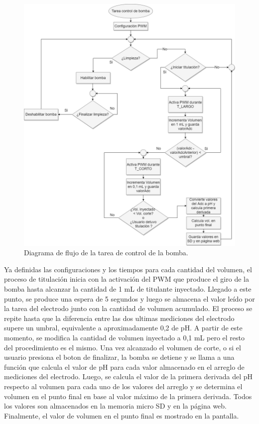 \begin{figure}[htbp]
	\centering
	\includegraphics[width=1.0\textwidth]{./Figures/motorBomba.png}
	\caption{Diagrama de flujo de la tarea de control de la bomba.}
	\label{fig:flujoBomba}
\end{figure}

Ya definidas las configuraciones y los tiempos para cada cantidad del volumen, el proceso de titulación inicia con la activación del PWM que produce el giro de la bomba hasta alcanzar la cantidad de 1 mL de titulante inyectado. Llegado a este punto, se produce una espera de 5 segundos y luego se almacena el valor leído por la tarea del electrodo junto con la cantidad de volumen acumulado. El proceso se repite hasta que la diferencia entre las dos ultimas mediciones del electrodo supere un umbral, equivalente a aproximadamente 0,2 de pH. A partir de este momento, se modifica la cantidad de volumen inyectado a 0,1 mL pero el resto del procedimiento es el mismo. Una vez alcanzado el volumen de corte, o si el usuario presiona el boton de finalizar, la bomba se detiene y se llama a una función que calcula el valor de pH para cada valor almacenado en el arreglo de mediciones del electrodo. Luego, se calcula el valor de la primera derivada del pH respecto al volumen para cada uno de los valores del arreglo y se determina el volumen en el punto final en base al valor máximo de la primera derivada. Todos los valores son almacenados en la memoria micro SD y en la página web. Finalmente, el valor de volumen en el punto final es mostrado en la pantalla.


